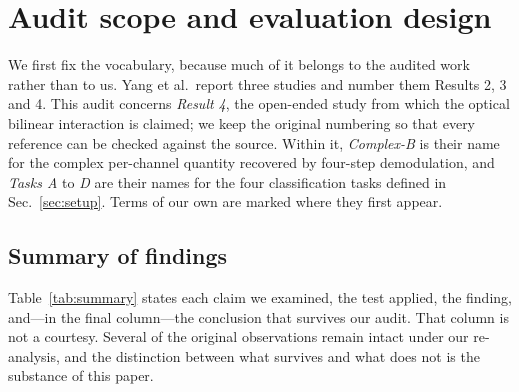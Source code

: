 \documentclass[11pt,a4paper]{article}
\begin{document}
\section{Audit scope and evaluation design}

We first fix the vocabulary, because much of it belongs to the audited work
rather than to us. Yang et al.\ report three studies and number them Results
2, 3 and 4. This audit concerns \emph{Result 4}, the open-ended study from
which the optical bilinear interaction is claimed; we keep the original
numbering so that every reference can be checked against the source. Within
it, \emph{Complex-B} is their name for the complex per-channel quantity
recovered by four-step demodulation, and \emph{Tasks A} to \emph{D} are their
names for the four classification tasks defined in
Sec.~\ref{sec:setup}. Terms of our own are marked where they first appear.

\subsection{Summary of findings}
\label{sec:summary}

Table~\ref{tab:summary} states each claim we examined, the test applied, the
finding, and---in the final column---the conclusion that survives our audit.
That column is not a courtesy. Several of the original observations remain
intact under our re-analysis, and the distinction between what survives and
what does not is the substance of this paper.
\end{document}
